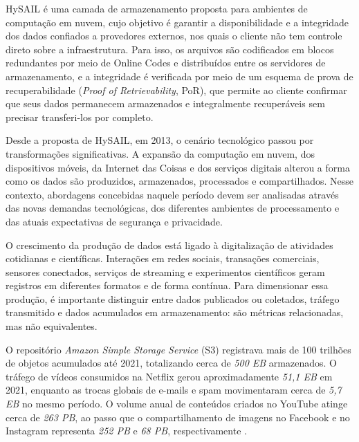 HySAIL \cite{amaral2013hysail,amaral2019hysail} é uma camada de armazenamento proposta para ambientes de computação em nuvem, cujo objetivo é garantir a disponibilidade e a integridade dos dados confiados a provedores externos, nos quais o cliente não tem controle direto sobre a infraestrutura. Para isso, os arquivos são codificados em blocos redundantes por meio de Online Codes e distribuídos entre os servidores de armazenamento, e a integridade é verificada por meio de um esquema de prova de recuperabilidade (\emph{Proof of Retrievability}, \acrshort{PoR}), que permite ao cliente confirmar que seus dados permanecem armazenados e integralmente recuperáveis sem precisar transferi-los por completo.

Desde a proposta de HySAIL, em 2013, o cenário tecnológico passou por transformações significativas. A expansão da computação em nuvem, dos dispositivos móveis, da Internet das Coisas e dos serviços digitais alterou a forma como os dados são produzidos, armazenados, processados e compartilhados. Nesse contexto, abordagens concebidas naquele período devem ser analisadas através das novas demandas tecnológicas, dos diferentes ambientes de processamento e das atuais expectativas de segurança e privacidade.

O crescimento da produção de dados está ligado à digitalização de atividades cotidianas e científicas. Interações em redes sociais, transações comerciais, sensores conectados, serviços de streaming e experimentos científicos geram registros em diferentes formatos e de forma contínua. Para dimensionar essa produção, é importante distinguir entre dados publicados ou coletados, tráfego transmitido e dados acumulados em armazenamento: são métricas relacionadas, mas não equivalentes.

O repositório \textit{Amazon Simple Storage Service} (S3) registrava mais de 100 trilhões de objetos acumulados até 2021, totalizando cerca de \textit{500 \acrshort{EB}} armazenados. O tráfego de vídeos consumidos na Netflix gerou aproximadamente \textit{51,1 \acrshort{EB}} em 2021\cite{frontiersbigdata}, enquanto as trocas globais de e-mails e spam movimentaram cerca de \textit{5,7 \acrshort{EB}} no mesmo período. O volume anual de conteúdos criados no YouTube atinge cerca de \textit{263 \acrshort{PB}}, ao passo que o compartilhamento de imagens no Facebook e no Instagram representa \textit{252 \acrshort{PB}} e \textit{68 \acrshort{PB}}, respectivamente \cite{frontiersbigdata}.

